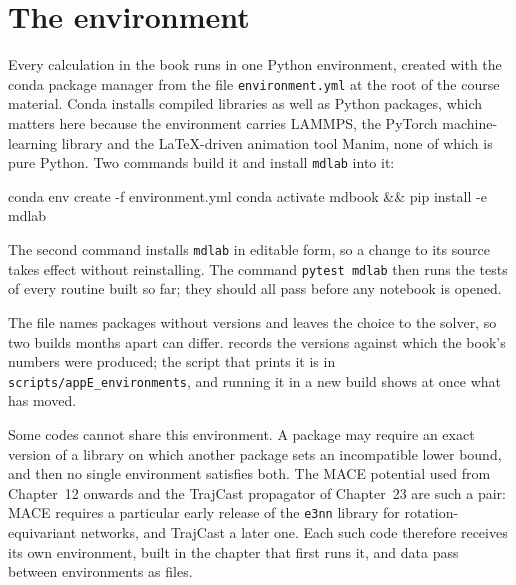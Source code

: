 \section{The environment}
\label{sec:env-environment}

Every calculation in the book runs in one Python environment, created with
the conda package manager from the file \texttt{environment.yml} at the root
of the course material. Conda installs compiled libraries as well as Python
packages, which matters here because the environment carries LAMMPS, the
PyTorch machine-learning library and the LaTeX-driven animation tool Manim,
none of which is pure Python. Two commands build it and install
\texttt{mdlab} into it:
\begin{code}[language=bash,numbers=none]
conda env create -f environment.yml
conda activate mdbook && pip install -e mdlab
\end{code}
The second command installs \texttt{mdlab} in editable form, so a change to
its source takes effect without reinstalling. The command \texttt{pytest
mdlab} then runs the tests of every routine built so far; they should all
pass before any notebook is opened.

The file names packages without versions and leaves the choice to the
solver, so two builds months apart can differ. 
records the versions against which the book's numbers were produced; the
script that prints it is in \texttt{scripts/appE\_environments}, and running
it in a new build shows at once what has moved.

\begin{table}[ht]
\centering
\caption{Versions of the principal packages in the environment that
produced the results of this book.}
\label{tab:env-versions}

\end{table}

Some codes cannot share this environment. A package may require an exact
version of a library on which another package sets an incompatible lower
bound, and then no single environment satisfies both. The MACE potential
used from Chapter~12 onwards and the TrajCast propagator of Chapter~23 are
such a pair: MACE requires a particular early release of the
\texttt{e3nn} library for rotation-equivariant networks, and TrajCast a
later one. Each such code therefore receives its own environment, built in
the chapter that first runs it, and data pass between environments as
files.
